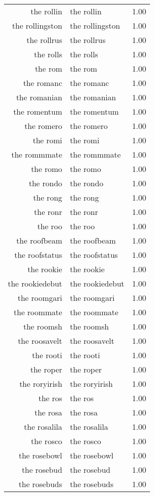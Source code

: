 \begin{table}[ht]
\begin{tabular}{rlr}
  the rollin & the rollin & 1.00 \\ 
  the rollingston & the rollingston & 1.00 \\ 
  the rollrus & the rollrus & 1.00 \\ 
  the rolls & the rolls & 1.00 \\ 
  the rom & the rom & 1.00 \\ 
  the romanc & the romanc & 1.00 \\ 
  the romanian & the romanian & 1.00 \\ 
  the romentum & the romentum & 1.00 \\ 
  the romero & the romero & 1.00 \\ 
  the romi & the romi & 1.00 \\ 
  the rommmate & the rommmate & 1.00 \\ 
  the romo & the romo & 1.00 \\ 
  the rondo & the rondo & 1.00 \\ 
  the rong & the rong & 1.00 \\ 
  the ronr & the ronr & 1.00 \\ 
  the roo & the roo & 1.00 \\ 
  the roofbeam & the roofbeam & 1.00 \\ 
  the roofstatus & the roofstatus & 1.00 \\ 
  the rookie & the rookie & 1.00 \\ 
  the rookiedebut & the rookiedebut & 1.00 \\ 
  the roomgari & the roomgari & 1.00 \\ 
  the roommate & the roommate & 1.00 \\ 
  the roomsh & the roomsh & 1.00 \\ 
  the roosavelt & the roosavelt & 1.00 \\ 
  the rooti & the rooti & 1.00 \\ 
  the roper & the roper & 1.00 \\ 
  the roryirish & the roryirish & 1.00 \\ 
  the ros & the ros & 1.00 \\ 
  the rosa & the rosa & 1.00 \\ 
  the rosalila & the rosalila & 1.00 \\ 
  the rosco & the rosco & 1.00 \\ 
  the rosebowl & the rosebowl & 1.00 \\ 
  the rosebud & the rosebud & 1.00 \\ 
  the rosebuds & the rosebuds & 1.00 \\ 

\end{tabular}
\end{table}
